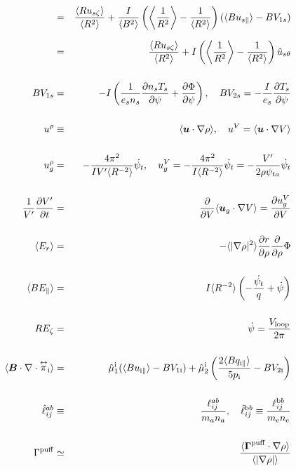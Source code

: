 \documentclass[11pt]{article}
\def\bvec#1{\leavevmode\hbox{\boldmath$#1$}}
\let\vec=\bvec
\def\r#1{{\rm#1}}
\def\ave#1{\left\langle#1\right\rangle}
\def\aves#1{\langle#1\rangle}
\def\dd#1#2{\frac{\partial #1}{\partial #2}}
\def\tensor#1{\mathord{\displaystyle\mathop{#1}^\leftrightarrow}}
\def\para{\parallel}
\def\ddrho{\frac{\partial}{\partial\rho}}
\def\psid{\dot{\psi}}
\def\psit{\psi_t}
\def\psitd{\dot{\psit}}
\def\Er{E_r}
\def\uszt{u_{s\zeta}}
\def\ugrho{u_{g}^\rho}
\def\ugV{u_{g}^V}
\def\uspara{u_{s\para}}
\begin{document}
\begin{eqnarray}
%
  &=& \frac{\aves{R\uszt}}{\aves{R^2}}
%
  + \frac{I}{\aves{B^2}} \left(  \ave{\frac{1}{R^2}}
			      - \frac{1}{\aves{R^2}} \right)
    (\aves{B\uspara} - BV_{1s})
\nonumber\\[2.5mm]
%
  &=& \frac{\aves{R\uszt}}{\aves{R^2}}
%
  + I \left(  \ave{\frac{1}{R^2}}
			       - \frac{1}{\aves{R^2}} \right) \hat{u}_{s\theta}
\nonumber\\[5mm]
  B V_{1s} &=&
%
 - I \left( \frac{1}{e_s n_s} \dd{n_s T_s}{\psi} + \dd{\Phi}{\psi}\right),
\quad
  B V_{2s} =
%
 - \frac{I}{e_s} \dd{T_s}{\psi}
\\[5mm]
  u^\rho &\equiv&
%
  \aves{ \vec{u} \cdot \nabla\rho },
%
  \quad u^V = \aves{ \vec{u} \cdot \nabla V }
\\[5mm]
  \ugrho &=&
%
  - \frac{4\pi^2}{IV'\aves{R^{-2}}} \psitd,
%
  \quad \ugV = - \frac{4\pi^2}{I\aves{R^{-2}}} \psitd = - \frac{V'}{2\rho\psi_{ta}}\psitd
\\[5mm]
  \frac{1}{V'}\dd{V'}{t} &=&
%
  \dd{}{V}\aves{\vec{u}_g\cdot\nabla V} = \dd{u_g^V}{V}
\\[5mm]
  \aves{\Er} &=&
%
  - \aves{|\nabla\rho|^2} \dd{r}{\rho} \ddrho \Phi
\\[5mm]
  \aves{B E_\para} &=&
%
  I \aves{R^{-2}} \left( - \frac{\psitd}{q} + \psid \right)
\\[5mm]
  R E_\zeta &=&
%
  \psid
%
  = \frac{V_\r{loop}}{2\pi}
\\[5mm]
  \aves{\vec{B}\cdot\nabla\cdot\tensor{\pi}_\r{i}} &=&
%
  \hat{\mu}_1^\r{i} ( \aves{Bu_{\r{i}\para}} - BV_{1\r{i}}) 
%
  + \hat{\mu}_2^\r{i} \left( \frac{2\aves{Bq_{\r{i}\para}}}{5p_\r{i}} -
		       BV_{2\r{i}}\right)
\\[5mm]
  \hat{\ell}_{ij}^{ab} &\equiv& \frac{\ell_{ij}^{ab}}{m_an_a},
  \quad
  \hat{\ell}_{ij}^{\r{b}b} \equiv \frac{\ell_{ij}^{\r{b}b}}{m_\r{e}n_\r{e}}
\\[5mm]
  \Gamma^\r{puff} &\simeq& \frac{\aves{\vec{\Gamma}^\r{puff}\cdot\nabla\rho}}{\aves{|\nabla\rho|}}
\end{eqnarray}
\end{document}
